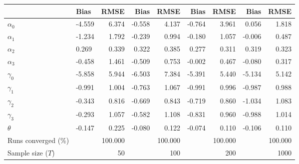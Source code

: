 
\begin{tabular}[t]{llrrrrrrr}
\toprule
  & Bias & RMSE & Bias & RMSE & Bias & RMSE & Bias & RMSE\\
\midrule
$\alpha_{0}$ & -4.559 & 6.374 & -0.558 & 4.137 & -0.764 & 3.961 & 0.056 & 1.818\\
$\alpha_{1}$ & -1.234 & 1.792 & -0.239 & 0.994 & -0.180 & 1.057 & -0.006 & 0.487\\
$\alpha_{2}$ & 0.269 & 0.339 & 0.322 & 0.385 & 0.277 & 0.311 & 0.319 & 0.323\\
$\alpha_{3}$ & -0.458 & 1.461 & -0.509 & 0.753 & -0.002 & 0.467 & -0.080 & 0.317\\
$\gamma_{0}$ & -5.858 & 5.944 & -6.503 & 7.384 & -5.391 & 5.440 & -5.134 & 5.142\\
$\gamma_{1}$ & -0.991 & 1.004 & -0.763 & 1.067 & -0.991 & 0.996 & -0.987 & 0.988\\
$\gamma_{2}$ & -0.343 & 0.816 & -0.669 & 0.843 & -0.719 & 0.860 & -1.034 & 1.083\\
$\gamma_{3}$ & -0.293 & 1.057 & -0.582 & 1.108 & -0.831 & 0.960 & -0.988 & 1.014\\
$\theta$ & -0.147 & 0.225 & -0.080 & 0.122 & -0.074 & 0.110 & -0.106 & 0.110\\
Runs converged (\%) &  & 100.000 &  & 100.000 &  & 100.000 &  & 100.000\\
Sample size ($T$) &  & 50 &  & 100 &  & 200 &  & 1000\\
\bottomrule
\end{tabular}
